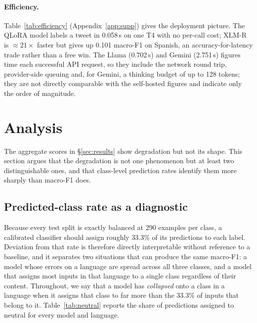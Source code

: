 \documentclass[11pt]{article}
\begin{document}
\paragraph{Efficiency.}
Table~\ref{tab:efficiency} (Appendix~\ref{app:supp}) gives the deployment picture. The QLoRA model labels a
tweet in 0.058\,s on one T4 with no per-call cost; \mbox{XLM-R} is ${\approx}21\times$
faster but gives up 0.101 macro-F1 on Spanish, an accuracy-for-latency trade rather
than a free win. The Llama (0.702\,s) and Gemini (2.751\,s) figures time each
successful API request, so they include the network round trip, provider-side
queuing and, for Gemini, a thinking budget of up to 128 tokens; they are not
directly comparable with the self-hosted figures and indicate only the order of
magnitude.


\section{Analysis}
\label{sec:analysis}

The aggregate scores in \S\ref{sec:results} show degradation but not its shape.
This section argues that the degradation is not one phenomenon but at least two
distinguishable ones, and that class-level prediction rates identify them more
sharply than macro-F1 does.

\subsection{Predicted-class rate as a diagnostic}
\label{sec:diagnostic}

Because every test split is exactly balanced at 290 examples per class, a
calibrated classifier should assign roughly 33.3\% of its predictions to each
label. Deviation from that rate is therefore directly interpretable without
reference to a baseline, and it separates two situations that can produce the same
macro-F1: a model whose errors on a language are spread across all three classes,
and a model that assigns most inputs in that language to a single class regardless
of their content.
Throughout, we say that a model has \emph{collapsed} onto a class in a language
when it assigns that class to far more than the 33.3\% of inputs that belong to
it.
Table~\ref{tab:neutral} reports the share of predictions assigned to neutral for
every model and language.
\end{document}
